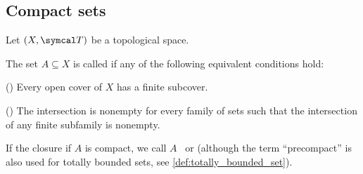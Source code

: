 \subsection{Compact sets}\label{sec:compact_sets}

Let \( (X, \Cal{T}) \) be a topological space.

\begin{definition}\label{def:compact_set}\cite[40]{Deimling1985}
  The set \( A \subseteq X \) is called  if any of the following equivalent conditions hold:
  \begin{defenum}
    \item\label{def:compact_set/union} () Every open cover of \( X \) has a finite subcover.
    \item\label{def:compact_set/intersection} () The intersection is nonempty for every family of sets such that the intersection of any finite subfamily is nonempty.
  \end{defenum}

  If the closure if \( A \) is compact, we call \( A \)~ or  (although the term \enquote{precompact} is also used for totally bounded sets, see \ref{def:totally_bounded_set}).
\end{definition}
